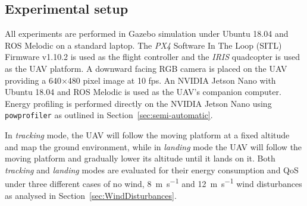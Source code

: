 \documentclass[conference]{IEEEtran}
\newcommand{\stt}[1]{{\small\tt #1}} %
\newcommand{\powprof}{\stt{powprofiler}}
\begin{document}

\subsection{Experimental setup}

All experiments are performed in Gazebo simulation under Ubuntu 18.04
and ROS Melodic on a standard
laptop. The \emph{PX4} Software In The Loop (SITL) Firmware v1.10.2 is used as the flight
controller and the \emph{IRIS} quadcopter is used as the UAV platform. A
downward facing RGB camera is placed on the UAV providing a
\SI{640}{}$\times$\SI{480}{} pixel image at 10 fps. An NVIDIA Jetson Nano
with Ubuntu 18.04 and ROS Melodic is used as the UAV's companion
computer. 
%
Energy profiling is performed directly on the NVIDIA Jetson
  Nano using \powprof{} as outlined in Section~\ref{sec:semi-automatic}.
  
%
%
In \emph{tracking} mode, the UAV will follow the moving platform at a fixed
altitude and map the ground environment,
while in \emph{landing} mode the UAV will follow the moving platform and
gradually lower its altitude until it lands on it. Both \emph{tracking} and
\emph{landing} modes are evaluated for their energy consumption and QoS under three different cases of no wind, \SI{8}{\meter \per \second} and \SI{12}{\meter \per \second} wind disturbances as analysed in Section~\ref{sec:WindDisturbances}.
\end{document}
